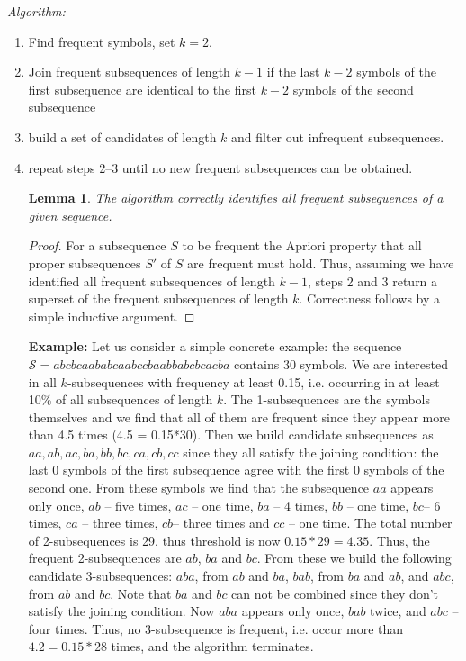 \documentclass{llncs}
\newtheorem{lemmx}{Lemma}
\begin{document}
{\em Algorithm:} 
\begin{enumerate}
\item Find frequent symbols, set $k=2$.
\item Join frequent subsequences of length $k-1$ if the last $k-2$ symbols of the first subsequence are identical to the first $k-2$ symbols of the second subsequence
\item build a set of candidates of length $k$ and filter out infrequent subsequences.
\item repeat steps 2--3 until no new frequent subsequences can be obtained.

\begin{lemmx}
The algorithm correctly identifies all frequent subsequences of a given sequence.
\end{lemmx}
\begin{proof}
For a subsequence $S$ to be frequent the Apriori property that all proper subsequences $S'$ of $S$ are frequent must hold. Thus, assuming we have identified all frequent subsequences of length $k-1$, steps 2 and 3 return a superset of the frequent subsequences of length $k$. Correctness follows by a simple inductive argument.
\end{proof}

{\bf Example:}  Let us consider a simple concrete example: the sequence $\mathcal{S} = abcbca ababca abccba abbabc bcacba$ contains 30 symbols. We are interested in all $k$-subsequences with frequency at least 0.15, i.e. occurring in at least 10\% of all subsequences of length $k$. The 1-subsequences are the symbols themselves and we find that all of them are frequent since they appear more than 4.5 times (4.5 = 0.15*30). Then we build candidate subsequences as $aa, ab, ac, ba, bb, bc, ca, cb, cc$ since they all satisfy the joining condition: the last 0 symbols of the first subsequence agree with the first 0 symbols of the second one. From these symbols we find that the subsequence $aa$ appears only once, $ab$ -- five times, $ac$ -- one time, $ba$ -- 4 times, $bb$ -- one time, $bc$-- 6 times, $ca$ -- three times, $cb$-- three times and $cc$ -- one time. The total number of 2-subsequences is 29, thus threshold is now $0.15 * 29 = 4.35$. Thus, the frequent 2-subsequences are $ab$, $ba$ and $bc$. From these we build the following candidate 3-subsequences: $aba$, from $ab$ and $ba$, $bab$, from $ba$ and $ab$, and $abc$, from $ab$ and $bc$. Note that $ba$ and $bc$ can not be combined since they don't satisfy the joining condition. Now $aba$ appears only once, $bab$ twice, and $abc$ -- four times. Thus, no 3-subsequence is frequent, i.e. occur more than $4.2 = 0.15*28$ times, and the algorithm terminates.


\end{enumerate}
\end{document}
